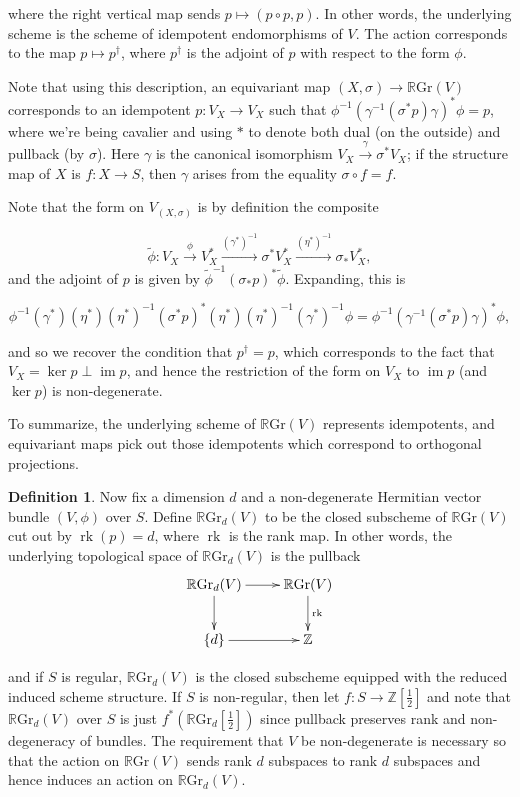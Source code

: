 \documentclass[edeposit,fullpage]{uiucthesis2009}
\newcommand{\Z}{\mathbb Z}
\newcommand{\RGr}{\mathbb R\mathrm{Gr}}
\DeclareMathOperator*{\im}{im}
\DeclareMathOperator{\rk}{rk}
\theoremstyle{plain}
\numberwithin{lemma}{section}
\theoremstyle{definition}
\newtheorem{definition}[lemma]{Definition}
\begin{document}
where the right vertical map sends $p \mapsto (p \circ p, p)$. In
other words, the underlying scheme is the scheme of idempotent
endomorphisms of $V$. The action corresponds to the map $p \mapsto
p^\dagger$, where $p^\dagger$ is the adjoint of $p$ with respect to
the form $\phi$. 

Note that using this description, an equivariant map $(X,\sigma) \rightarrow
\RGr(V)$ corresponds to an idempotent $p : V_X \rightarrow V_X$ such
that $\phi^{-1}(\gamma^{-1}(\sigma^*p)\gamma)^*\phi = p$, where we're being cavalier
and using $\ast$ to denote both dual (on the outside) and pullback (by
$\sigma$). Here $\gamma$ is the canonical isomorphism $V_X
\xrightarrow{\gamma} \sigma^*V_X$; if the structure map of $X$ is $f :
X \rightarrow S$, then $\gamma$ arises from the equality $\sigma \circ f = f$.

Note that the form on $V_{(X,\sigma)}$ is by definition the composite

\[
\widetilde \phi : V_X \xrightarrow{\phi} V_X^* \xrightarrow{(\gamma^*)^{-1}} \sigma^*V_X^*
\xrightarrow{(\eta^*)^{-1}} \sigma_*V_X^*,
\]
and the adjoint of $p$ is given by $\widetilde \phi^{-1} (\sigma_*p)^*
\widetilde \phi$. Expanding, this is

\[
\phi^{-1}(\gamma^*)(\eta^*)(\eta^*)^{-1}(\sigma^*p)^*(\eta^*)(\eta^*)^{-1}(\gamma^*)^{-1}\phi
= \phi^{-1}(\gamma^{-1}(\sigma^*p)\gamma)^*\phi,
\]

and so we recover the condition that $p^\dagger  =  p$, which
corresponds to the fact that $V_X = \ker p \perp \im p$, and hence the
restriction of the form on $V_X$ to $\im p$ (and $\ker p$) is
non-degenerate. 

To summarize, the underlying scheme of $\RGr(V)$ represents
idempotents, and equivariant maps pick out those idempotents which
correspond to orthogonal projections. 

\begin{definition}

Now fix a dimension $d$ and a non-degenerate Hermitian vector bundle
$(V,\phi)$ over $S$.  Define $\RGr_d(V)$ to be the closed
subscheme of $\RGr(V)$ cut out by $\rk(p) = d$, where $\rk$ is the
rank map. In other words, the underlying topological space of $\RGr_d(V)$ is the pullback
\[
\xymatrix{\RGr_d(V) \ar[r]\ar[d] & \RGr(V) \ar[d]^{\rk} \\ \{d\}
  \ar[r] & \Z}
\]

and if $S$ is regular, $\RGr_d(V)$ is the closed subscheme equipped with the reduced
induced scheme structure. If $S$ is non-regular, then let $f : S
\rightarrow \Z[\frac{1}{2}]$ and note that $\RGr_d(V)$ over $S$ is
just $f^*(\RGr_d[\frac{1}{2}])$ since pullback preserves rank and
non-degeneracy of bundles. The requirement that $V$ be non-degenerate is necessary so that the action
on $\RGr(V)$ sends rank $d$ subspaces to rank $d$ subspaces and hence
induces an action on $\RGr_d(V)$. 
\end{definition}
\end{document}
